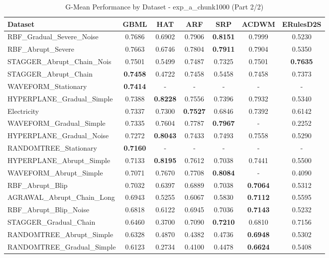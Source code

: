 \begin{table}[htbp]
\centering
\caption{G-Mean Performance by Dataset - exp_a_chunk1000 (Part 2/2)}
\label{tab:gmean_exp_a_chunk1000_2}
\footnotesize
\begin{tabular}{lcccccc}
\toprule
Dataset & GBML & HAT & ARF & SRP & ACDWM & ERulesD2S \\
\midrule
RBF_Gradual_Severe_Noise & 0.7686 & 0.6902 & 0.7906 & \textbf{0.8151} & 0.7999 & 0.5230 \\
RBF_Abrupt_Severe & 0.7663 & 0.6746 & 0.7804 & \textbf{0.7911} & 0.7904 & 0.5350 \\
STAGGER_Abrupt_Chain_Nois & 0.7501 & 0.5499 & 0.7487 & 0.7325 & 0.7501 & \textbf{0.7635} \\
STAGGER_Abrupt_Chain & \textbf{0.7458} & 0.4722 & 0.7458 & 0.5458 & 0.7458 & 0.7373 \\
WAVEFORM_Stationary & \textbf{0.7414} & - & - & - & - & - \\
HYPERPLANE_Gradual_Simple & 0.7388 & \textbf{0.8228} & 0.7556 & 0.7396 & 0.7932 & 0.5340 \\
Electricity & 0.7337 & 0.7300 & \textbf{0.7527} & 0.6846 & 0.7392 & 0.6142 \\
WAVEFORM_Gradual_Simple & 0.7335 & 0.7604 & 0.7787 & \textbf{0.7967} & - & 0.2252 \\
HYPERPLANE_Gradual_Noise & 0.7272 & \textbf{0.8043} & 0.7433 & 0.7493 & 0.7558 & 0.5290 \\
RANDOMTREE_Stationary & \textbf{0.7160} & - & - & - & - & - \\
HYPERPLANE_Abrupt_Simple & 0.7133 & \textbf{0.8195} & 0.7612 & 0.7038 & 0.7441 & 0.5500 \\
WAVEFORM_Abrupt_Simple & 0.7071 & 0.7670 & 0.7708 & \textbf{0.8084} & - & 0.4090 \\
RBF_Abrupt_Blip & 0.7032 & 0.6397 & 0.6889 & 0.7038 & \textbf{0.7064} & 0.5312 \\
AGRAWAL_Abrupt_Chain_Long & 0.6943 & 0.5255 & 0.6067 & 0.5830 & \textbf{0.7112} & 0.5595 \\
RBF_Abrupt_Blip_Noise & 0.6818 & 0.6122 & 0.6945 & 0.7036 & \textbf{0.7143} & 0.5232 \\
STAGGER_Gradual_Chain & 0.6460 & 0.3700 & 0.7090 & \textbf{0.7210} & 0.6810 & 0.7156 \\
RANDOMTREE_Abrupt_Simple & 0.6328 & 0.4870 & 0.4382 & 0.4736 & \textbf{0.6948} & 0.5302 \\
RANDOMTREE_Gradual_Simple & 0.6123 & 0.2734 & 0.4100 & 0.4478 & \textbf{0.6624} & 0.5408 \\

\end{tabular}
\end{table}
